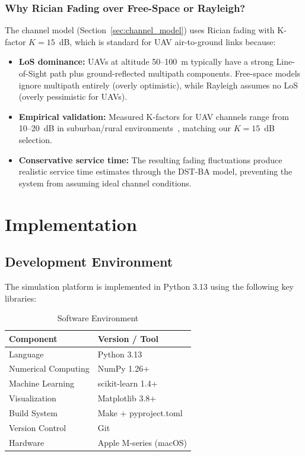 \documentclass[12pt, a4paper, oneside]{report}
\begin{document}
\subsection{Why Rician Fading over Free-Space or Rayleigh?}

The channel model (Section~\ref{sec:channel_model}) uses Rician fading with K-factor $K = 15$~dB, which is standard for UAV air-to-ground links because:
\begin{itemize}
    \item \textbf{LoS dominance:} UAVs at altitude 50--100~m typically have a strong Line-of-Sight path plus ground-reflected multipath components. Free-space models ignore multipath entirely (overly optimistic), while Rayleigh assumes no LoS (overly pessimistic for UAVs).
    \item \textbf{Empirical validation:} Measured K-factors for UAV channels range from 10--20~dB in suburban/rural environments~\cite{al2014optimal}, matching our $K = 15$~dB selection.
    \item \textbf{Conservative service time:} The resulting fading fluctuations produce realistic service time estimates through the DST-BA model, preventing the system from assuming ideal channel conditions.
\end{itemize}


\chapter{Implementation}
\label{ch:implementation}

\section{Development Environment}

The simulation platform is implemented in Python 3.13 using the following key libraries:

\begin{table}[htbp]
\centering
\caption{Software Environment}
\label{tab:software}
\begin{tabular}{ll}
\toprule
\textbf{Component} & \textbf{Version / Tool} \\
\midrule
Language & Python 3.13 \\
Numerical Computing & NumPy 1.26+ \\
Machine Learning & scikit-learn 1.4+ \\
Visualization & Matplotlib 3.8+ \\
Build System & Make + pyproject.toml \\
Version Control & Git \\
Hardware & Apple M-series (macOS) \\
\bottomrule
\end{tabular}
\end{table}
\end{document}
